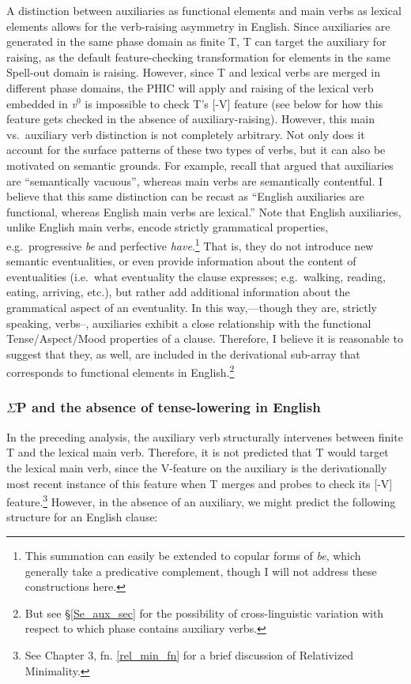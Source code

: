 A distinction between auxiliaries as functional elements and main verbs as lexical elements allows for the verb-raising asymmetry in English. Since auxiliaries are generated in the same phase domain as finite T\raisebox{-3pt}{\footnotesize{[-V]}}, T can target the auxiliary for raising, as the default feature-checking transformation for elements in the same Spell-out domain is raising. However, since T\raisebox{-3pt}{\footnotesize{[-V]}} and lexical verbs are merged in different phase domains, the PHIC will apply and raising of the lexical verb embedded in {\it v}$^{0}$ is impossible to check T's [-V] feature (see below for how this feature gets checked in the absence of auxiliary-raising). However, this main vs.\ auxiliary verb distinction is not completely arbitrary. Not only does it account for the surface patterns of these two types of verbs, but it can also be motivated on semantic grounds. For example, recall that \citet{chomsky1993} argued that auxiliaries are ``semantically vacuous'', whereas main verbs are semantically contentful. I believe that this same distinction can be recast as ``English auxiliaries are functional, whereas English main verbs are lexical.'' Note that English auxiliaries, unlike English main verbs, encode strictly grammatical properties, e.g.\ progressive {\it be} and perfective {\it have}.\footnote{This summation can easily be extended to copular forms of {\it be}, which generally take a predicative complement, though I will not address these constructions here.} That is, they do not introduce new semantic eventualities, or even provide information about the content of eventualities (i.e.\ what eventuality the clause expresses; e.g.\ walking, reading, eating, arriving, etc.), but rather add additional information about the grammatical aspect of an eventuality. In this way,---though they are, strictly speaking, verbs--, auxiliaries exhibit a close relationship with the functional Tense/Aspect/Mood properties of a clause. Therefore, I believe it is reasonable to suggest that they, as well, are included in the derivational sub-array that corresponds to functional elements in English.\footnote{But see \S\ref{Se_aux_sec} for the possibility of cross-linguistic variation with respect to which phase contains auxiliary verbs.}

\subsubsection{$\Sigma$P and the absence of tense-lowering in English}\label{sigma_sec}
In the preceding analysis, the auxiliary verb structurally intervenes between finite T and the lexical main verb. Therefore, it is not predicted that T would target the lexical main verb, since the V-feature on the auxiliary is the derivationally most recent instance of this feature when T merges and probes to check its [-V] feature.\footnote{See Chapter 3, fn. \ref{rel_min_fn} for a brief discussion of Relativized Minimality.} However, in the absence of an auxiliary, we might predict the following structure for an English clause:

